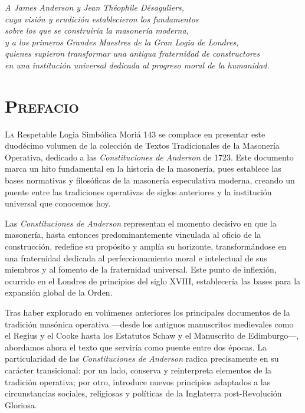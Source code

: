 \documentclass[a4paper,12pt,twoside]{book}
\begin{document}
\thispagestyle{empty}
\clearpage
\null
\thispagestyle{empty}
\clearpage

\thispagestyle{empty}
\vspace*{5cm}
\begin{flushright}
\large
\emph{A James Anderson y Jean Théophile Désaguliers,\\
cuya visión y erudición establecieron los fundamentos\\
sobre los que se construiría la masonería moderna,\\
y a los primeros Grandes Maestres de la Gran Logia de Londres,\\
quienes supieron transformar una antigua fraternidad de constructores\\
en una institución universal dedicada al progreso moral de la humanidad.}
\end{flushright}
\clearpage

\chapter*{\centering\scshape Prefacio}
\thispagestyle{empty}
\lettrine[lines=3, lhang=0.1, loversize=0.1]{\textcolor{dorado}{L}}{a} Respetable Logia Simbólica Moriá 143 se complace en presentar este duodécimo volumen de la colección de Textos Tradicionales de la Masonería Operativa, dedicado a las \textit{Constituciones de Anderson} de 1723. Este documento marca un hito fundamental en la historia de la masonería, pues establece las bases normativas y filosóficas de la masonería especulativa moderna, creando un puente entre las tradiciones operativas de siglos anteriores y la institución universal que conocemos hoy.

Las \textit{Constituciones de Anderson} representan el momento decisivo en que la masonería, hasta entonces predominantemente vinculada al oficio de la construcción, redefine su propósito y amplía su horizonte, transformándose en una fraternidad dedicada al perfeccionamiento moral e intelectual de sus miembros y al fomento de la fraternidad universal. Este punto de inflexión, ocurrido en el Londres de principios del siglo XVIII, establecería las bases para la expansión global de la Orden.

Tras haber explorado en volúmenes anteriores los principales documentos de la tradición masónica operativa —desde los antiguos manuscritos medievales como el Regius y el Cooke hasta los Estatutos Schaw y el Manuscrito de Edimburgo—, abordamos ahora el texto que serviría como puente entre dos épocas. La particularidad de las \textit{Constituciones de Anderson} radica precisamente en su carácter transicional: por un lado, conserva y reinterpreta elementos de la tradición operativa; por otro, introduce nuevos principios adaptados a las circunstancias sociales, religiosas y políticas de la Inglaterra post-Revolución Gloriosa.
\end{document}
